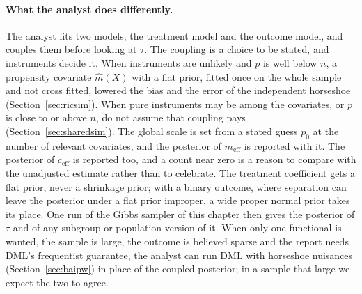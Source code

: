 \paragraph{What the analyst does differently.} The analyst fits two models, the treatment model and the outcome model, and couples them before looking at $\tau$. The coupling is a choice to be stated, and instruments decide it. When instruments are unlikely and $p$ is well below $n$, a propensity covariate $\hat m(X)$ with a flat prior, fitted once on the whole sample and not cross fitted, lowered the bias and the error of the independent horseshoe (Section~\ref{sec:ricsim}). When pure instruments may be among the covariates, or $p$ is close to or above $n$, do not assume that coupling pays (Section~\ref{sec:sharedsim}). The global scale is set from a stated guess $p_0$ at the number of relevant covariates, and the posterior of $m_{\mathrm{eff}}$ is reported with it. The posterior of $c_{\mathrm{eff}}$ is reported too, and a count near zero is a reason to compare with the unadjusted estimate rather than to celebrate. The treatment coefficient gets a flat prior, never a shrinkage prior; with a binary outcome, where separation can leave the posterior under a flat prior improper, a wide proper normal prior takes its place. One run of the Gibbs sampler of this chapter then gives the posterior of $\tau$ and of any subgroup or population version of it. When only one functional is wanted, the sample is large, the outcome is believed sparse and the report needs DML's frequentist guarantee, the analyst can run DML with horseshoe nuisances (Section~\ref{sec:baipw}) in place of the coupled posterior; in a sample that large we expect the two to agree.

